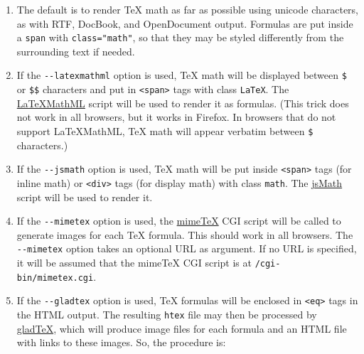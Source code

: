 \documentclass[]{article}
\begin{document}
\begin{description}
\begin{enumerate}
\def\labelenumi{\arabic{enumi}.}
\item
  The default is to render TeX math as far as possible using unicode
  characters, as with RTF, DocBook, and OpenDocument output. Formulas
  are put inside a \texttt{span} with \texttt{class="math"}, so that
  they may be styled differently from the surrounding text if needed.
\item
  If the \texttt{-\/-latexmathml} option is used, TeX math will be
  displayed between \texttt{\$} or \texttt{\$\$} characters and put in
  \texttt{\textless{}span\textgreater{}} tags with class \texttt{LaTeX}.
  The \href{http://math.etsu.edu/LaTeXMathML/}{LaTeXMathML} script will
  be used to render it as formulas. (This trick does not work in all
  browsers, but it works in Firefox. In browsers that do not support
  LaTeXMathML, TeX math will appear verbatim between \texttt{\$}
  characters.)
\item
  If the \texttt{-\/-jsmath} option is used, TeX math will be put inside
  \texttt{\textless{}span\textgreater{}} tags (for inline math) or
  \texttt{\textless{}div\textgreater{}} tags (for display math) with
  class \texttt{math}. The
  \href{http://www.math.union.edu/~dpvc/jsmath/}{jsMath} script will be
  used to render it.
\item
  If the \texttt{-\/-mimetex} option is used, the
  \href{http://www.forkosh.com/mimetex.html}{mimeTeX} CGI script will be
  called to generate images for each TeX formula. This should work in
  all browsers. The \texttt{-\/-mimetex} option takes an optional URL as
  argument. If no URL is specified, it will be assumed that the mimeTeX
  CGI script is at \texttt{/cgi-bin/mimetex.cgi}.
\item
  If the \texttt{-\/-gladtex} option is used, TeX formulas will be
  enclosed in \texttt{\textless{}eq\textgreater{}} tags in the HTML
  output. The resulting \texttt{htex} file may then be processed by
  \href{http://ans.hsh.no/home/mgg/gladtex/}{gladTeX}, which will
  produce image files for each formula and an HTML file with links to
  these images. So, the procedure is:


\end{enumerate}
\end{description}
\end{document}

